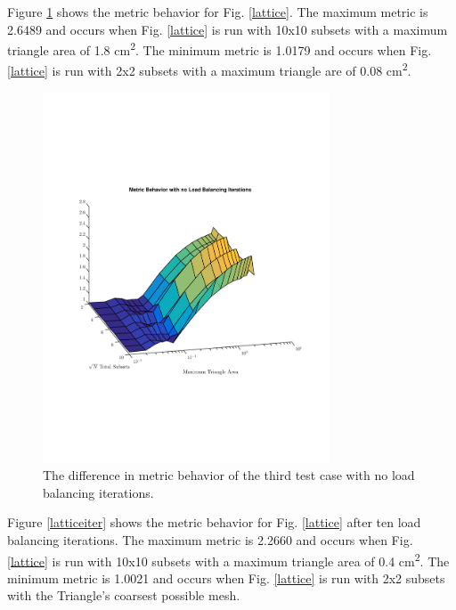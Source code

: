 \documentclass{anstrans}
\begin{document}
Figure \ref{latticenoiter} shows the metric behavior for Fig. \ref{lattice}. The maximum metric is 2.6489 and occurs when Fig. \ref{lattice} is run with 10x10 subsets with a maximum triangle area of 1.8 cm\textsuperscript{2}. The minimum metric is 1.0179 and occurs when Fig. \ref{lattice} is run with 2x2 subsets with a maximum triangle are of 0.08 cm\textsuperscript{2}.

\begin{figure}
\centering
\includegraphics[width=85mm, trim = 0cm 5cm 0cm 5cm,clip]{figures/lattice_no_iter.pdf}
\caption{The difference in metric behavior of the third test case with no load balancing iterations.}
\label{latticenoiter}
\end{figure}

Figure \ref{latticeiter} shows the metric behavior for Fig. \ref{lattice} after ten load balancing iterations. The maximum metric is 2.2660 and occurs when Fig. \ref{lattice} is run with 10x10 subsets with a maximum triangle area of 0.4 cm\textsuperscript{2}. The minimum metric is 1.0021 and occurs when Fig. \ref{lattice} is run with 2x2 subsets with the Triangle's coarsest possible mesh.
\end{document}
